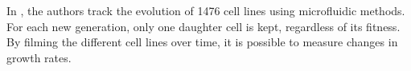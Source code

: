 In \cite{robert2018mutation}, the authors track the evolution of 1476 cell lines using microfluidic methods. For each new generation, only one daughter cell is kept, regardless of its fitness. \\
By filming the different cell lines over time, it is possible to measure changes in growth rates.


